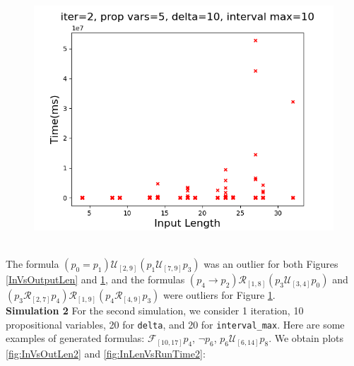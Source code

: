 \documentclass[runningheads]{llncs}
\begin{document}
\begin{minipage}{0.5 \textwidth}
    \begin{figure}[H]
    \centering
    \includegraphics[scale=0.35]{images/Sim1Time_large.png}
    \label{InLenVsRunTime}
    \end{figure}
\end{minipage}\\
\noindent The formula $(p_0 = p_1) \mathcal{U}_{[2,9]} (p_1 \mathcal{U}_{[7,9]} p_3)$ was an outlier for both Figures \ref{InVsOutputLen} and \ref{InLenVsRunTime}, and the formulas $(p_4 \rightarrow p_2) \mathcal{R}_{[1,8]} (p_3 \mathcal{U}_{[3,4]} p_0)$ and $(p_3 \mathcal{R}_{[2,7]} p_4) \mathcal{R}_{[1,9]} (p_4 \mathcal{R}_{[4,9]} p_3)$ were outliers for Figure \ref{InLenVsRunTime}. \\
\noindent\textbf{Simulation 2}
For the second simulation, we consider 1 iteration, 10 propositional variables, 20 for \texttt{delta}, and 20 for \texttt{interval\_max}. Here are some examples of generated formulas:
$\mathcal{F}_{[10,17]} p_4$, $\neg p_6$, $p_6 \mathcal{U}_{[6,14]} p_8$. We obtain plots \ref{fig:InVsOutLen2} and \ref{fig:InLenVsRunTime2}:\\
\end{document}
